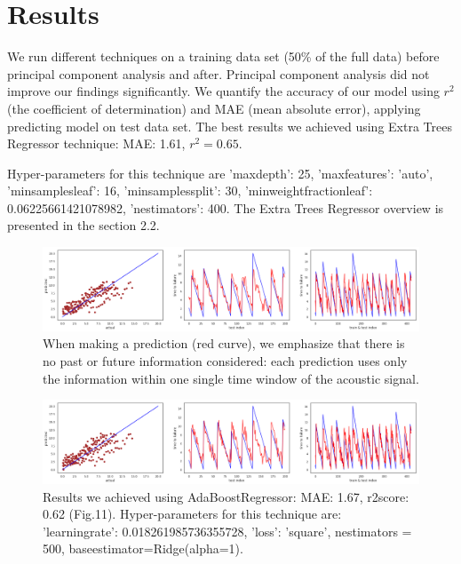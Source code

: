 \documentclass[]{llncs} %
\begin{document}
\section{Results}
We run different techniques on a training data set (50\% of the full data) before principal component analysis and after. Principal component analysis did not improve our findings significantly. We quantify the accuracy of our model using $r^2$ (the coefficient of determination) and MAE (mean absolute error), applying predicting model on test data set. The best results we achieved using  Extra Trees Regressor technique: MAE: 1.61, $r^2 = 0.65$. \par

Hyper-parameters for this technique are 'maxdepth': 25,  'maxfeatures': 'auto', 'minsamplesleaf': 16,  'minsamplessplit': 30, 'minweightfractionleaf': 0.06225661421078982,  'nestimators': 400. The Extra Trees Regressor overview is presented in the section 2.2.

\begin{figure}[h!]
	\centering
	\includegraphics[width=01\linewidth]{results1}
	\caption{When making a prediction (red curve), we emphasize that there is no past or future information considered: each prediction uses only the information within one single time window of the acoustic signal.}
	\label{fig:results1}
\end{figure}

\begin{figure}[h!]
	\centering
	\includegraphics[width=01\linewidth]{results2}
	\caption{Results we achieved using AdaBoostRegressor: MAE: 1.67, r2score: 0.62 (Fig.11).
		Hyper-parameters for this technique are: 'learningrate': 0.018261985736355728, 'loss': 'square', nestimators = 500, baseestimator=Ridge(alpha=1).
	}
	\label{fig:results2}
\end{figure}
\end{document}
